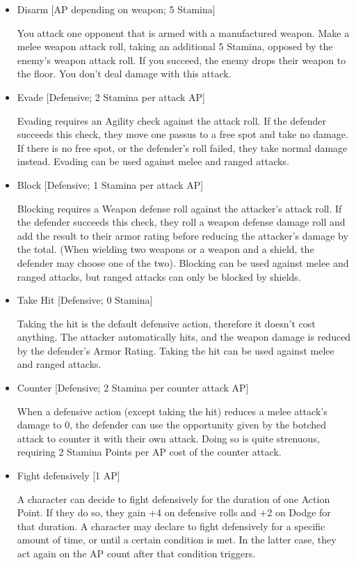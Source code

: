\begin{itemize}
\item Disarm [AP depending on weapon; 5 Stamina]

You attack one opponent that is armed with a manufactured weapon. Make a melee weapon attack roll, taking an additional 5 Stamina, opposed by the enemy's weapon attack roll. If you succeed, the enemy drops their weapon to the floor. You don't deal damage with this attack.\\


\item Evade [Defensive; 2 Stamina per attack AP]

Evading requires an Agility check against the attack roll. If the defender succeeds this check, they move one passus to a free spot and take no damage. If there is no free spot, or the defender’s roll failed, they take normal damage instead. Evading can be used against melee and ranged attacks.


\item Block [Defensive; 1 Stamina per attack AP]

Blocking requires a Weapon defense roll against the attacker's attack roll. If the defender succeeds this check, they roll a weapon defense damage roll and add the result to their armor rating before reducing the attacker’s damage by the total. (When wielding two weapons or a weapon and a shield, the defender may choose one of the two). Blocking can be used against melee and ranged attacks, but ranged attacks can only be blocked by shields.



\item Take Hit [Defensive; 0 Stamina]

Taking the hit is the default defensive action, therefore it doesn’t cost anything. The attacker automatically hits, and the weapon damage is reduced by the defender’s Armor Rating. Taking the hit can be used against melee and ranged attacks.


\item Counter [Defensive; 2 Stamina per counter attack AP]

When a defensive action (except taking the hit) reduces a melee attack's damage to 0, the defender can use the opportunity given by the botched attack to counter it with their own attack. Doing so is quite strenuous, requiring 2 Stamina Points per AP cost of the counter attack.


\item Fight defensively [1 AP]

A character can decide to fight defensively for the duration of one Action Point. If they do so, they gain +4 on defensive rolls and +2 on Dodge for that duration. A character may declare to fight defensively for a specific amount of time, or until a certain condition is met. In the latter case, they act again on the AP count after that condition triggers.



\end{itemize}
